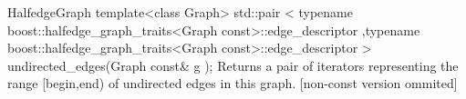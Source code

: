 \begin{ccRefConcept}{HalfedgeGraph}
  \ccFunction
  {template<class Graph>
  std::pair < typename boost::halfedge_graph_traits<Graph const>::edge_descriptor
             ,typename boost::halfedge_graph_traits<Graph const>::edge_descriptor
             >   
  undirected_edges(Graph const& g );
  }
  {Returns a pair of iterators representing the range [begin,end) of undirected edges in this graph.
  [non-const version ommited]
  }

\ccHasModels
{}\\
\\

\end{ccRefConcept}

